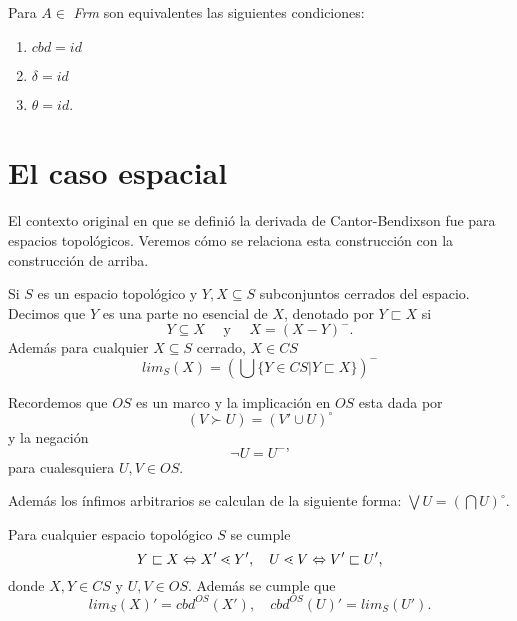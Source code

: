 \begin{cor}
Para $A\in$ \textit{Frm} son equivalentes las siguientes condiciones:
\begin{enumerate}
\item $cbd=id$
\item $\delta=id$
\item $\theta=id$.
\end{enumerate}
\end{cor}

\section{El caso espacial}
El contexto original en que se definió la derivada de
Cantor-Bendixson fue para espacios topológicos.
Veremos cómo se relaciona esta construcción con la construcción
de arriba.

\begin{defn}
Si $S$ es un espacio topológico y $Y, X\subseteq S$ subconjuntos cerrados del espacio. Decimos que $Y$ es una parte no esencial de $X$, denotado por $Y\sqsubset X$ si 
$$Y\subseteq X \quad\mbox{ y }\quad X=(X-Y)^-.$$ 
Además para cualquier $X\subseteq S$ cerrado, $X\in CS$
$$lim_S(X)=\left(\bigcup\{Y\in CS|Y\sqsubset X\}\right)^-$$
\end{defn}

\noindent
Recordemos que $OS$ es un marco y la implicación en $OS$ esta dada por $$(V\succ U)=(V'\cup U)^\circ$$ 
y la negación $$\neg U=U^-\mbox{'}$$ para cualesquiera $U,V\in OS$.

\noindent
Además los ínfimos arbitrarios se calculan de la siguiente forma: $\bigvee U=\left(\bigcap U\right)^\circ$.

\begin{lemma}\label{Lema50}
Para cualquier espacio topológico $S$ se cumple $$Y\sqsubset X\Leftrightarrow X'\lessdot Y',\mbox\quad U\lessdot V\Leftrightarrow V'\sqsubset U',$$
donde $X, Y\in CS$ y $U, V\in OS$. Además se cumple que $$lim_S(X)'=cbd^{OS}(X'),\quad cbd^{OS}(U)'=lim_S(U').$$
\end{lemma}

